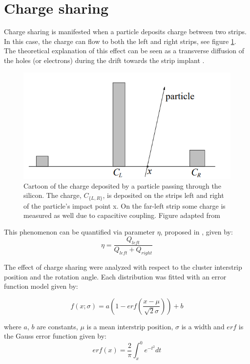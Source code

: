 \section{Charge sharing}
Charge sharing is manifested when a particle deposits charge between two strips.  In this case, the charge can flow to both the left and right strips, see figure \ref{fig:eta}. The theoretical explanation of this effect can be seen as a transverse diffusion of the holes (or electrons) during the drift towards the strip implant \cite{semiconductors_det_sys}. 
 

\begin{figure}[htb]
\centering
\includegraphics[scale=0.8]{figures/eta/eta.PNG}
\caption{Cartoon of the charge deposited by a particle passing through the silicon. The charge, $C_{\{L, R\}}$, is deposited on the strips left and right of the particle’s impact point x. On the far-left strip some charge is measured as well due to capacitive coupling. Figure adapted from \cite{eta_note} } 
\label{fig:eta}
\end{figure}

This phenomenon can be quantified via parameter $\eta$, proposed in \cite{eta}, given by:
\begin{equation}
    \eta = \frac{Q_{left}}{Q_{left}+Q_{right}}
\end{equation}

The effect of charge sharing were analyzed with respect to the cluster interstrip position and the rotation angle. Each distribution was fitted with an error function model given by:

\begin{equation}
\label{eq:eta_model}
f(x;\sigma) = a \left(1 - erf(\frac{x-\mu}{\sqrt{2}\sigma})\right) + b
\end{equation}

where $a$, $b$ are constants,  $\mu$ is a mean interstrip position, $\sigma$ is a width and $erf$ is the Gauss error function given by:
\begin{equation}
erf(x) = \frac{2}{\pi} \int^{0}_{x} e^{-t^2} dt
\end{equation}

